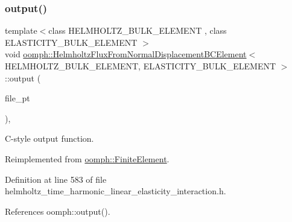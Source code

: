 \subsubsection{\texorpdfstring{output()}{output()}\hspace{0.1cm}{\footnotesize\ttfamily [3/4]}}
{\footnotesize\ttfamily template$<$class H\+E\+L\+M\+H\+O\+L\+T\+Z\+\_\+\+B\+U\+L\+K\+\_\+\+E\+L\+E\+M\+E\+NT , class E\+L\+A\+S\+T\+I\+C\+I\+T\+Y\+\_\+\+B\+U\+L\+K\+\_\+\+E\+L\+E\+M\+E\+NT $>$ \\
void \hyperlink{classoomph_1_1HelmholtzFluxFromNormalDisplacementBCElement}{oomph\+::\+Helmholtz\+Flux\+From\+Normal\+Displacement\+B\+C\+Element}$<$ H\+E\+L\+M\+H\+O\+L\+T\+Z\+\_\+\+B\+U\+L\+K\+\_\+\+E\+L\+E\+M\+E\+NT, E\+L\+A\+S\+T\+I\+C\+I\+T\+Y\+\_\+\+B\+U\+L\+K\+\_\+\+E\+L\+E\+M\+E\+NT $>$\+::output (\begin{DoxyParamCaption}\item[{F\+I\+LE $\ast$}]{file\+\_\+pt }\end{DoxyParamCaption})\hspace{0.3cm}{\ttfamily [inline]}, {\ttfamily [virtual]}}



C-\/style output function. 



Reimplemented from \hyperlink{classoomph_1_1FiniteElement_a72cddd09f8ddbee1a20a1ff404c6943e}{oomph\+::\+Finite\+Element}.



Definition at line 583 of file helmholtz\+\_\+time\+\_\+harmonic\+\_\+linear\+\_\+elasticity\+\_\+interaction.\+h.



References oomph\+::output().

\mbox{\label{classoomph_1_1HelmholtzFluxFromNormalDisplacementBCElement_a3a08931249b5071b11ec8082848cc94e}} 
